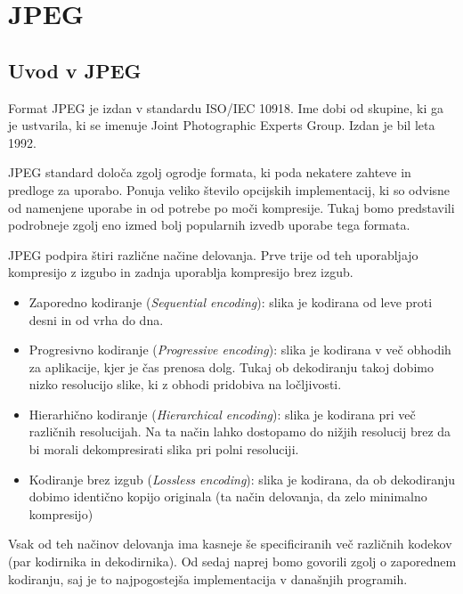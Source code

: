 \documentclass[a4paper,12pt,openright]{book}
\begin{document}
\section{JPEG}
\subsection{Uvod v JPEG}
Format JPEG je izdan v standardu ISO/IEC 10918. Ime dobi od skupine, ki ga je ustvarila, ki se imenuje Joint Photographic Experts Group. Izdan je bil leta 1992.\par
JPEG standard določa zgolj ogrodje formata, ki poda nekatere zahteve in predloge za uporabo. Ponuja veliko število opcijskih implementacij, ki so odvisne od namenjene uporabe in od potrebe po moči kompresije. Tukaj bomo predstavili podrobneje zgolj eno izmed bolj popularnih izvedb uporabe tega formata.\par 

JPEG podpira štiri različne načine delovanja. Prve trije od teh uporabljajo kompresijo z izgubo in zadnja uporablja kompresijo brez izgub.
\begin{itemize}
   \item Zaporedno kodiranje (\textit{Sequential encoding}): slika je kodirana od leve proti desni in od vrha do dna.
   \item Progresivno kodiranje (\textit{Progressive encoding}): slika je kodirana v več obhodih za aplikacije, kjer je čas prenosa dolg. Tukaj ob dekodiranju takoj dobimo nizko resolucijo slike, ki z obhodi pridobiva na ločljivosti.
   \item Hierarhično kodiranje (\textit{Hierarchical encoding}): slika je kodirana pri več različnih resolucijah. Na ta način lahko dostopamo do nižjih resolucij brez da bi morali dekompresirati slika pri polni resoluciji.
   \item Kodiranje brez izgub (\textit{Lossless encoding}): slika je kodirana, da ob dekodiranju dobimo identično kopijo originala (ta način delovanja, da zelo minimalno kompresijo)
\end{itemize}
Vsak od teh načinov delovanja ima kasneje še specificiranih več različnih kodekov (par kodirnika in dekodirnika).
Od sedaj naprej bomo govorili zgolj o zaporednem kodiranju, saj je to najpogostejša implementacija v današnjih programih.\par
\end{document}
